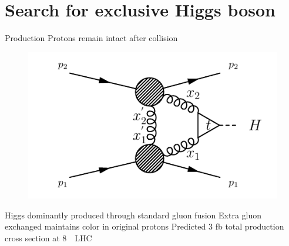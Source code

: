 \documentclass[10pt]{beamer}
\begin{document}
\section{Search for exclusive Higgs boson}

\begin{frame}{Production}
\centering
{\large\color{blue} Protons remain intact after collision }\\
%
%
\begin{figure}
\centering
\includegraphics[width=0.8\linewidth]{figures/exclH.pdf}
\end{figure}
\begin{outline}
\1 Higgs dominantly produced through standard gluon fusion
\1 Extra gluon exchanged maintains color in original protons
\1 Predicted 3 fb total production cross section at 8~\TeV\ LHC
\end{outline}
\end{frame}
\end{document}
